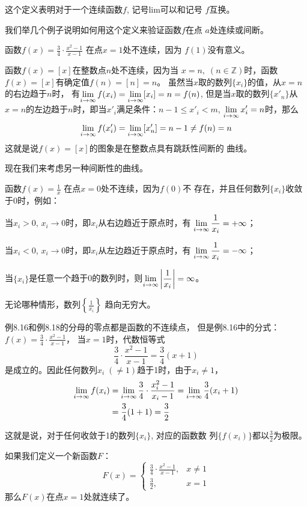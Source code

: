 这个定义表明对于一个连续函数$f$, 记号lim可以和记号
$f$互换。

我们举几个例子说明如何用这个定义来验证函数$f$在点
$a$处连续或间断。


\begin{example}
    函数$f(x)=\frac{3}{4}\cdot\frac{x^2-1}{x-1}$
在点$x=1$处不连续，因为
$f(1)$没有意义。
\end{example}

\begin{example}
    函数$f(x)=[x]$在整数点$n$处不连续，因为当
$x=n,\; (n\in\mathbb{Z})$时，函数$f(x)=[x]$有确定值$f(n)=[n]=n$。
虽然当$x$取的数列$\{x_i\}$的值，从$x=n$的右边趋于$n$时，
有$\displaystyle\lim_{i\to\infty}f(x_i)=\displaystyle\lim_{i\to\infty}[x_i]=n=f(n)$, 但是当$x$取的数列$\{x'_n\}$从$x=n$的左边趋于$n$时，即当$x'_i$满足条件：$n-1\le x'_i <m$, $\displaystyle\lim_{i\to \infty}x'_i=n$时，那么
\[\displaystyle\lim_{i\to \infty}f(x'_i)=\displaystyle\lim_{i\to \infty}[x'_n]=n-1\ne f(n)=n\]
这就是说$f(x)=[x]$的图象是在整数点具有跳跃性间断的
曲线。
\end{example}

现在我们来考虑另一种间断性的曲线。
\begin{example}
    函数$f(x)=\frac{1}{x}$
    在点$x=0$处不连续，因为$f(0)$不
    存在，并且任何数列$\{x_i\}$收敛于0时，例如：
    
    当$x_i>0$, $x_i\to 0$时，即$x_i$从右边趋近于原点时，有
$\displaystyle\lim_{i\to\infty}\dfrac{1}{x_i}=+\infty$；

    当$x_i<0$, $x_i\to 0$时，即$x_i$从左边趋近于原点时，有
    $\displaystyle\lim_{i\to\infty}\dfrac{1}{x_i}=-\infty$；

    当$\{x_i\}$是任意一个趋于0的数列时，则$\displaystyle\lim_{i\to\infty}\left|\dfrac{1}{x_i}\right|=\infty$。

    无论哪种情形，数列$\left\{\frac{1}{x_i}\right\}$
    趋向无穷大。
\end{example}

\begin{rmk}
例8.16和例8.18的分母的零点都是函数的不连续点，
但是例8.16中的分式：$f(x)=\frac{3}{4}\cdot\frac{x^2-1}{x-1}$，
当$x=1$时，代数恒等式
\[\frac{3}{4}\cdot\frac{x^2-1}{x-1}=\frac{3}{4}(x+1)\]
是成立的。因此任何数列$x_i\; (\ne 1)$趋于1时，由于$x_i\ne 1$，
\[\begin{split}
    \displaystyle\lim_{i\to\infty}f(x_i)&=\displaystyle\lim_{i\to\infty}\dfrac{3}{4}\cdot \dfrac{x^2_i-1}{x_i-1}=\displaystyle\lim_{i\to\infty}\dfrac{3}{4}(x_i+1)\\
    &=\dfrac{3}{4}(1+1)=\dfrac{3}{2}
\end{split}\]

这就是说，对于任何收敛于1的数列$\{x_i\}$, 对应的函数数
列$\{f(x_i)\}$都以$\frac{3}{2}$为极限。 

如果我们定义一个新函数$F$：
\[F(x)=\begin{cases}
    \frac{3}{4}\cdot\frac{x^2-1}{x-1},& x\ne 1\\
    \frac{3}{2}, & x=1
\end{cases}\]
那么$F(x)$在点$x=1$处就连续了。
\end{rmk}

